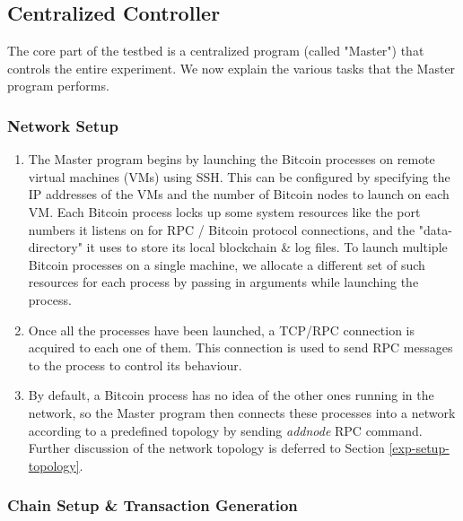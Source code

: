 
\newpage
\subsection{Centralized Controller} \label{impl-master}

The core part of the testbed is a centralized program (called "Master") that controls the entire experiment. We now explain the various tasks that the Master program performs.


\subsubsection{Network Setup}

\begin{enumerate}
    \item The Master program begins by launching the Bitcoin processes on remote virtual machines (VMs) using SSH.
          This can be configured by specifying the IP addresses of the VMs and the number of Bitcoin nodes to launch on each VM.
          Each Bitcoin process locks up some system resources like the port numbers it listens on for RPC / Bitcoin protocol connections, and the "data-directory" it uses to store its local blockchain \& log files.
          To launch multiple Bitcoin processes on a single machine, we allocate a different set of such resources for each process by passing in arguments while launching the process.

    \item Once all the processes have been launched, a TCP/RPC connection is acquired to each one of them. 
          This connection is used to send RPC messages to the process to control its behaviour.

    \item By default, a Bitcoin process has no idea of the other ones running in the network, so the Master program then connects these processes into a network according to a predefined topology by sending \textit{addnode} RPC command.
          Further discussion of the network topology is deferred to Section \ref{exp-setup-topology}.
\end{enumerate}
      
\subsubsection{Chain Setup \& Transaction Generation}


